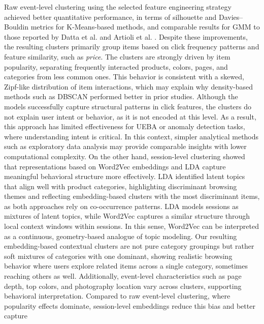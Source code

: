 \documentclass[a4paper,oneside,12pt]{book}
\begin{document}




Raw event-level clustering using the selected feature engineering strategy achieved better quantitative performance, in terms of silhouette and Davies–Bouldin metrics for K-Means-based methods, and comparable results for GMM to those reported by Datta et al. \cite{datta} and Artioli et al. \cite{Artioli2024ACI}. Despite these improvements, the resulting clusters primarily group items based on click frequency patterns and feature similarity, such as \textit{price}. The clusters are strongly driven by item popularity, separating frequently interacted products, colors, pages, and categories from less common ones. This behavior is consistent with a skewed, Zipf-like distribution of item interactions, which may explain why density-based methods such as DBSCAN performed better in prior studies. Although the models successfully capture structural patterns in click features, the clusters do not explain user intent or behavior, as it is not encoded at this level. As a result, this approach has limited effectiveness for UEBA or anomaly detection tasks, where understanding intent is critical. In this context, simpler analytical methods such as exploratory data analysis may provide comparable insights with lower computational complexity. On the other hand, session-level clustering showed that representations based on Word2Vec embeddings and LDA capture meaningful behavioral structure more effectively. LDA identified latent topics that align well with product categories, highlighting discriminant browsing themes and reflecting embedding-based clusters with the most discriminant items, as both approaches rely on co-occurrence patterns. LDA models sessions as mixtures of latent topics, while Word2Vec captures a similar structure through local context windows within sessions. In this sense, Word2Vec can be interpreted as a continuous, geometry-based analogue of topic modeling. Our resulting embedding-based contextual clusters are not pure category groupings but rather soft mixtures of categories with one dominant, showing realistic browsing behavior where users explore related items across a single category, sometimes reaching others as well. Additionally, event-level characteristics such as page depth, top colors, and photography location vary across clusters, supporting behavioral interpretation. Compared to raw event-level clustering, where popularity effects dominate, session-level embeddings reduce this bias and better capture 
\end{document}

